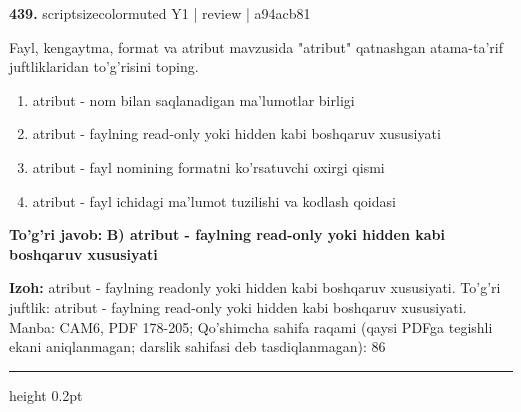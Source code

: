 \documentclass[10pt,a4paper]{article}
\begin{document}
{\bfseries\sffamily\color{ink} 439.} {scriptsizecolor{muted} Y1 | review | a94acb81}
\par
Fayl, kengaytma, format va atribut mavzusida "atribut" qatnashgan atama-ta'rif juftliklaridan to'g'risini toping.
\begin{enumerate}[label=\Alph*),leftmargin=9mm]
\item atribut - nom bilan saqlanadigan ma'lumotlar birligi
\item atribut - faylning read-only yoki hidden kabi boshqaruv xususiyati
\item atribut - fayl nomining formatni ko'rsatuvchi oxirgi qismi
\item atribut - fayl ichidagi ma'lumot tuzilishi va kodlash qoidasi
\end{enumerate}
\begin{tcolorbox}[enhanced,breakable,colback=teal!4,colframe=teal!60!black,boxrule=0.45pt,arc=1.2mm,left=2.7mm,right=2.7mm,top=1.8mm,bottom=1.8mm,before skip=2mm,after skip=2mm]
{\bfseries\sffamily\color{teal}To'g'ri javob:} \textbf{B) atribut - faylning read-only yoki hidden kabi boshqaruv xususiyati}
\par\smallskip
{\bfseries Izoh:} atribut - faylning readonly yoki hidden kabi boshqaruv xususiyati. To'g'ri juftlik: atribut - faylning read-only yoki hidden kabi boshqaruv xususiyati. Manba: CAM6, PDF 178-205; Qo'shimcha sahifa raqami (qaysi PDFga tegishli ekani aniqlanmagan; darslik sahifasi deb tasdiqlanmagan): 86
\end{tcolorbox}
\vspace{2mm}\hrule height 0.2pt\vspace{3mm}
\end{document}
